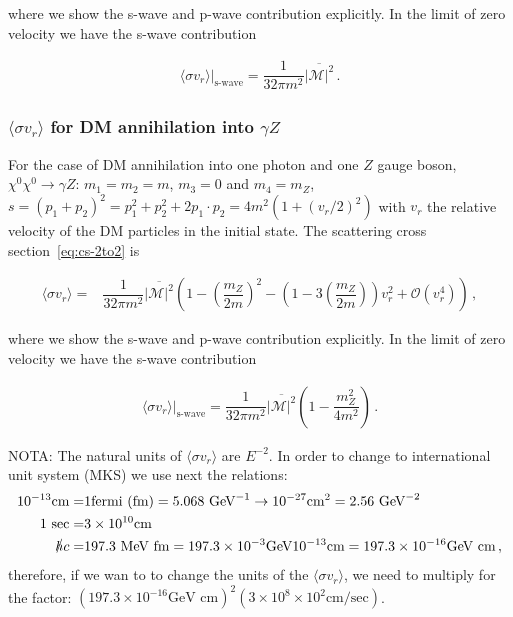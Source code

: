 where we show the s-wave and p-wave contribution explicitly. In the limit of zero velocity we have the s-wave contribution

\begin{align}
\langle\sigma v_r\rangle|_{\text{s-wave}}=\dfrac{1}{32\pi m^2}\overline{{|\mathcal{M}|^2}}\,.
\end{align}

\subsubsection{$\langle\sigma v_r\rangle$ for DM annihilation into $\gamma Z$}

For the case of DM annihilation into one photon and one $Z$ gauge boson, $\chi^0\chi^0\rightarrow\gamma Z$: $m_1=m_2=m$, $m_3=0$ and $m_4=m_Z$,     $ s=(p_1+p_2)^2=p_1^2+p_2^2+2p_1\cdot p_2=4m^2(1+(v_r/2)^2)$ with $v_r$ the relative velocity of the DM particles in the initial state. 
The scattering cross section~\eqref{eq:cs-2to2} is

\begin{align}
\langle\sigma v_r\rangle=&\dfrac{1}{32\pi m^2}\overline{{|\mathcal{M}|^2}}
\left(1-\left(\dfrac{m_Z}{2m}\right)^2  -\left(1-3\left(\dfrac{m_Z}{2m}\right)\right) v_r^2   +\mathcal{O}(v_r^4)\right) \,,
\end{align}

where we show the s-wave and p-wave contribution explicitly. In the limit of zero velocity we have the s-wave contribution

\begin{align}
\langle\sigma v_r\rangle|_{\text{s-wave}}=\dfrac{1}{32\pi m^2}\overline{{|\mathcal{M}|^2}}\left(1-\dfrac{m_Z^2}{4m^2}\right)\,.
\end{align}

\noindent
{\color{red}NOTA}: The natural units of $\langle\sigma v_r\rangle$ are $E^{-2}$. In order to change to international unit system (MKS) we use next the relations:
\begin{align*}
10^{-13} \text{cm} = & 1 \text{fermi (fm)}=5.068\text{ GeV}^{-1} \to
10^{-27} \text{cm}^2 = 2.56 \text{ GeV}^{-2} \\
1 \text{ sec} =& 3\times10^{10} \text{cm} \\
\slashed{h}c =& 197.3 \text{ MeV }\text{fm}=197.3\times10^{-3} \text{GeV} 10^{-13} \text{cm}=197.3\times10^{-16} \text{GeV cm}\,,
\end{align*}
%
therefore, if we wan to to change the units of the $\langle\sigma v_r\rangle$, we need to multiply for the factor:
$(197.3\times 10^{-16} \text{GeV cm})^2 (3\times 10^8\times 10^2 \text{cm/sec})$.







